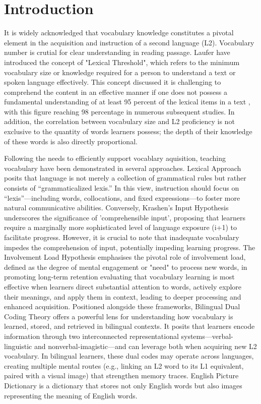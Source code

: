 \documentclass{ehissymp}
\begin{document}
\section{Introduction}
It is widely acknowledged that vocabulary knowledge constitutes a pivotal element in the acquisition and instruction of a second language (L2). Vocabulary number is crutial for clear understanding in reading passage\cite{alderson1984,deville1985,nation1987}. Laufer\cite{laufer1989,Laufer2003} have introduced the concept of "Lexical Threshold", which refers to the minimum vocabulary size or knowledge required for a person to understand a text or spoken language effectively. This concept discussed it is challenging to comprehend the content in an effective manner if one does not possess a fundamental understanding of at least 95 percent of the lexical items in a text\cite{laufer1992,vanzeeland2013} , with this figure reaching 98 percentage in numerous subsequent studies\cite{laufer2010}. In addition, the correlation between vocabulary size and L2 proficiency is not exclusive to the quantity of words learners possess; the depth of their knowledge of these words is also directly proportional\cite{qian2002}.

Following the needs to efficiently support vocablary aquisition, teaching vocabulary have been demonstrated in several approaches. Lexical Approach \cite{lewis1993,lewis1997} posits that language is not merely a collection of grammatical rules but rather consists of “grammaticalized lexis.” In this view, instruction should focus on “lexis”—including words, collocations, and fixed expressions—to foster more natural communicative abilities. Conversely, Krashen's Input Hypothesis\cite{krashen1977,krashen2003} underscores the significance of 'comprehensible input', proposing that learners require a marginally more sophisticated level of language exposure (i+1) to facilitate progress. However, it is crucial to note that inadequate vocabulary impedes the comprehension of input, potentially impeding learning progress. The Involvement Load Hypothesis\cite{hulstijn2001} emphasises the pivotal role of involvement load, defined as the degree of mental engagement or "need" to process new words, in promoting long-term retention evaluating that vocabulary learning is most effective when learners direct substantial attention to words, actively explore their meanings, and apply them in context, leading to deeper processing and enhanced acquisition. Positioned alongside these frameworks, Bilingual Dual Coding Theory \cite{paivio1991,clark1987} offers a powerful lens for understanding how vocabulary is learned, stored, and retrieved in bilingual contexts. It posits that learners encode information through two interconnected representational systems—verbal-linguistic and nonverbal-imagistic—and can leverage both when acquiring new L2 vocabulary. In bilingual learners, these dual codes may operate across languages, creating multiple mental routes (e.g., linking an L2 word to its L1 equivalent, paired with a visual image) that strengthen memory traces. English Picture Dictionary is a dictionary that stores not only English words but also images representing the meaning of English words.
\end{document}
